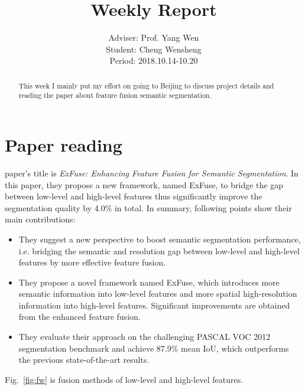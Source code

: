 \documentclass[]{IEEEtran}
\begin{document}
	\title{Weekly Report}
	\author{Adviser: Prof. Yang Wen \\Student: Cheng Wensheng\\ Period: 2018.10.14-10.20
	}
	\maketitle

\begin{abstract}
	This week I mainly put my effort on going to Beijing to discuss project details and reading the paper about feature fusion semantic segmentation.
\end{abstract}

\section{Paper reading}
	 paper's title is \emph{ExFuse: Enhancing Feature Fusion for Semantic Segmentation}. In this paper, they propose a new framework, named ExFuse, to bridge the gap between low-level and high-level features thus significantly improve the segmentation quality by 4.0\% in total. In summary, following points show their main contributions:
	\begin{itemize}
		\item They suggest a new perspective to boost semantic segmentation performance, i.e. bridging the semantic and resolution gap between low-level and high-level features by more effective feature fusion.
		\item They propose a novel framework named ExFuse, which introduces more semantic information into low-level features and more spatial high-resolution
		information into high-level features. Significant improvements are obtained from the enhanced feature fusion.		
		\item They evaluate their approach on the challenging PASCAL VOC 2012 segmentation benchmark and achieve 87.9\% mean IoU, which outperforms the previous state-of-the-art results.
	\end{itemize}
	
	Fig.~\ref{fig:fw} is fusion methods of low-level and high-level features.
	
\end{document}
